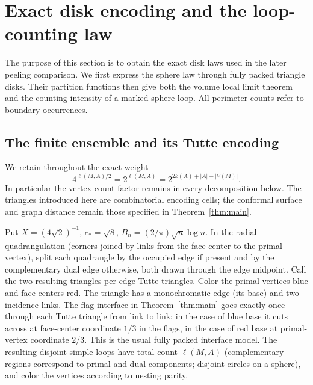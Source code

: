 \section{Exact disk encoding and the loop-counting law}\label{sec:discrete}

The purpose of this section is to obtain the exact disk laws used in the
later peeling comparison.  We first express the sphere law through
fully packed triangle disks.  Their partition functions then give both
the volume local limit theorem and the counting intensity of a marked
sphere loop.  All perimeter counts refer to boundary occurrences.

\subsection{The finite ensemble and its Tutte encoding}\label{disk:encoding}

We retain throughout the exact weight
\[
 4^{\ell(M,A)/2}=2^{\ell(M,A)}=2^{2k(A)+|A|-|V(M)|}.
\]
In particular the vertex-count factor remains in every decomposition below.
The triangles introduced here are combinatorial encoding cells; the conformal surface and graph distance remain those specified in Theorem~\ref{thm:main}.

Put \(X=(4\sqrt{2})^{-1}\), \(c_*=\sqrt 8\), \(B_n=(2/\pi)\sqrt n\log n\).
In the radial quadrangulation (corners joined by links from the face center to the primal vertex), split each quadrangle by the occupied edge if present and by the complementary dual edge otherwise, both drawn through the edge midpoint.
Call the two resulting triangles per edge Tutte triangles.
Color the primal vertices blue and face centers red.
The triangle has a monochromatic edge (its base) and two incidence links.
The flag interface in Theorem~\ref{thm:main} goes exactly once through each Tutte triangle from link to link; in the case of blue base it cuts across at face-center coordinate \(1/3\) in the flags, in the case of red base at primal-vertex coordinate \(2/3\).
This is the usual fully packed interface model.
The resulting disjoint simple loops have total count \(\ell(M,A)\) (complementary regions correspond to primal and dual components; disjoint circles on a sphere), and color the vertices according to nesting parity.

